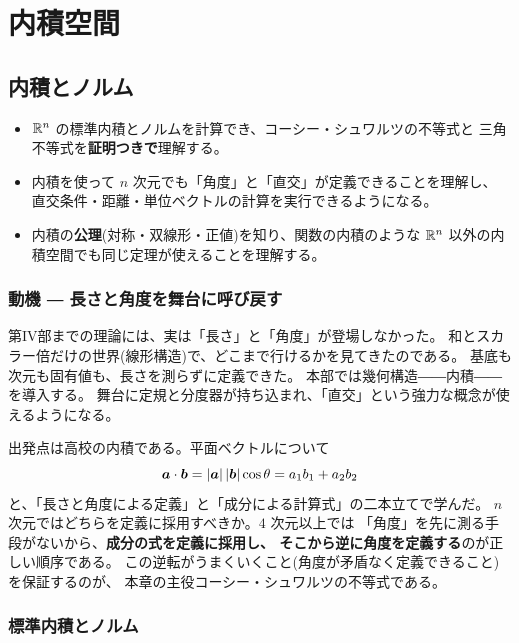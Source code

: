 \part{内積空間}

\chapter{内積とノルム}\label{chap:inner}

\begin{goal}
\begin{itemize}
\item $\mathbb{R}^n$ の標準内積とノルムを計算でき、コーシー・シュワルツの不等式と
三角不等式を\textbf{証明つきで}理解する。
\item 内積を使って $n$ 次元でも「角度」と「直交」が定義できることを理解し、
直交条件・距離・単位ベクトルの計算を実行できるようになる。
\item 内積の\textbf{公理}(対称・双線形・正値)を知り、関数の内積のような
$\mathbb{R}^n$ 以外の内積空間でも同じ定理が使えることを理解する。
\end{itemize}
\end{goal}

\section{動機 ― 長さと角度を舞台に呼び戻す}

第IV部までの理論には、実は「長さ」と「角度」が登場しなかった。
和とスカラー倍だけの世界(線形構造)で、どこまで行けるかを見てきたのである。
基底も次元も固有値も、長さを測らずに定義できた。
本部では幾何構造――内積――を導入する。
舞台に定規と分度器が持ち込まれ、「直交」という強力な概念が使えるようになる。

出発点は高校の内積である。平面ベクトルについて
\[
\bm{a} \cdot \bm{b} = |\bm{a}|\,|\bm{b}| \cos\theta
= a_1 b_1 + a_2 b_2
\]
と、「長さと角度による定義」と「成分による計算式」の二本立てで学んだ。
$n$ 次元ではどちらを定義に採用すべきか。$4$ 次元以上では
「角度」を先に測る手段がないから、\textbf{成分の式を定義に採用し、
そこから逆に角度を定義する}のが正しい順序である。
この逆転がうまくいくこと(角度が矛盾なく定義できること)を保証するのが、
本章の主役コーシー・シュワルツの不等式である。

\section{標準内積とノルム}

